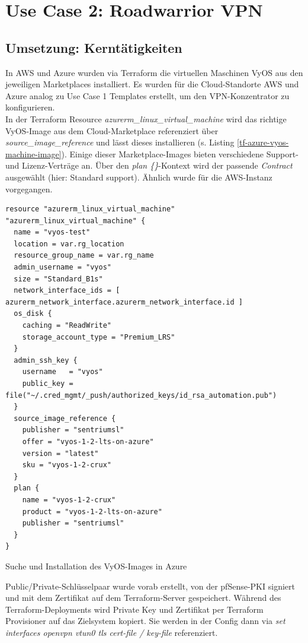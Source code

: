 \section{Use Case 2: Roadwarrior VPN} \label{Use-Case 2: Road Warrior}
\subsection{Umsetzung: Kerntätigkeiten}

In AWS und Azure wurden via Terraform die virtuellen Maschinen VyOS aus den jeweiligen Marketplaces installiert. Es wurden für die Cloud-Standorte AWS und Azure analog zu Use Case 1 Templates erstellt, um den \gls{VPN-Konzentrator} zu konfigurieren.\\
In der Terraform Resource \textit{azurerm\_linux\_virtual\_machine} wird das richtige VyOS-Image aus dem Cloud-Marketplace referenziert über \textit{source\_image\_reference} und lässt dieses installieren (s. Listing \ref{tf-azure-vyos-machine-image}). Einige dieser Market\-place-Images bieten verschiedene Support- und Lizenz-Verträge an. Über den \textit{plan \{\}}-Kontext wird der passende \textit{Contract} ausgewählt (hier: \glqq Standard support\grqq{}). Ähnlich wurde für die AWS-Instanz vorgegangen. 
\begin{listing}[h]
\begin{verbatim}
resource "azurerm_linux_virtual_machine"  "azurerm_linux_virtual_machine" {
  name = "vyos-test"
  location = var.rg_location
  resource_group_name = var.rg_name
  admin_username = "vyos"
  size = "Standard_B1s"
  network_interface_ids = [ azurerm_network_interface.azurerm_network_interface.id ]
  os_disk {
    caching = "ReadWrite"
    storage_account_type = "Premium_LRS"
  }
  admin_ssh_key {
    username   = "vyos"
    public_key = file("~/.cred_mgmt/_push/authorized_keys/id_rsa_automation.pub")
  }
  source_image_reference {
    publisher = "sentriumsl"
    offer = "vyos-1-2-lts-on-azure"
    version = "latest"
    sku = "vyos-1-2-crux"
  }
  plan {
    name = "vyos-1-2-crux"
    product = "vyos-1-2-lts-on-azure"
    publisher = "sentriumsl"
  }
}
\end{verbatim}
\caption{Suche und Installation des VyOS-Images in Azure}
\label{tf-azure-vyos-machine-image}
\end{listing}\FloatBarrier
Public/Private-Schlüsselpaar wurde vorab erstellt, von der pfSense-\gls{PKI} signiert und mit dem Zertifikat auf dem Terraform-Server gespeichert. Während des Terraform-\gls{Deployment}s wird Private Key und Zertifikat per Terraform Provisioner auf das Zielsystem kopiert. Sie werden in der Config dann via \textit{set interfaces openvpn vtun0 tls cert-file / key-file} referenziert.\\
